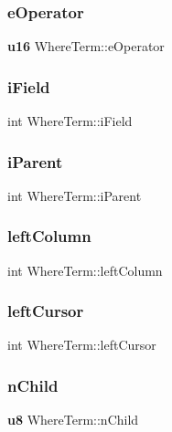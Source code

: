 \mbox{\label{struct_where_term_af0b4817bee491fa1ee69a87d8ff580c5}} 
\subsubsection{eOperator}
{\footnotesize\ttfamily \textbf{ u16} Where\+Term\+::e\+Operator}

\mbox{\label{struct_where_term_a39a20cab7599056102a325d8f1f2c0d9}} 
\subsubsection{iField}
{\footnotesize\ttfamily int Where\+Term\+::i\+Field}

\mbox{\label{struct_where_term_aa45e0b271713e429fbeba433941d2e22}} 
\subsubsection{iParent}
{\footnotesize\ttfamily int Where\+Term\+::i\+Parent}

\mbox{\label{struct_where_term_a1f6e520bd34633ebb6001cd0c39eef21}} 
\subsubsection{leftColumn}
{\footnotesize\ttfamily int Where\+Term\+::left\+Column}

\mbox{\label{struct_where_term_a82bb97ef4285d75b1b9c4fcd2025aaf7}} 
\subsubsection{leftCursor}
{\footnotesize\ttfamily int Where\+Term\+::left\+Cursor}

\mbox{\label{struct_where_term_af83cf7bae7760b9b1ca398338a35c32a}} 
\subsubsection{nChild}
{\footnotesize\ttfamily \textbf{ u8} Where\+Term\+::n\+Child}

